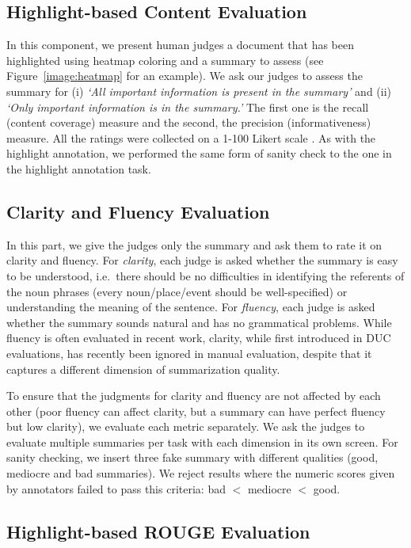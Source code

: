 \documentclass[11pt,a4paper]{article}
\begin{document}
\subsection{Highlight-based Content Evaluation}
In this component, we present human judges a document that has been highlighted using heatmap coloring and a summary to assess (see Figure~\ref{image:heatmap} for an example). We ask our judges to assess the summary for (i) \textit{`All important information is present in the summary'} and (ii) \textit{`Only important information is in the summary.'} The first one is the recall (content coverage) measure and the second, the precision (informativeness) measure. All the ratings were collected on a 1-100 Likert scale \citep{Likert1932}.
As with the highlight annotation, %
we performed the same form of sanity check to the one in the highlight annotation task.


\subsection{Clarity and Fluency Evaluation}
In this part, we give the judges only the summary and ask them to rate it on clarity and fluency. For {\em clarity}, each judge is asked whether the summary is easy to be understood, i.e.\ 
there should be no difficulties in identifying the referents of the noun phrases (every noun/place/event should be well-specified) or understanding the meaning of the sentence. For {\em fluency}, each judge is asked whether the summary sounds natural and has no grammatical problems. %
While fluency is often evaluated in recent work, clarity, while first introduced in DUC evaluations, has recently been ignored in manual evaluation, despite that it captures a different dimension of summarization quality.

To ensure that the judgments for clarity and fluency are not affected by each other (poor fluency can affect clarity, but a summary can have perfect fluency but low clarity), %
we evaluate each metric separately. We ask the judges to evaluate multiple summaries per task with each dimension in its own screen. For sanity checking, we insert three fake summary with different qualities (good, mediocre and bad summaries). We reject results where the numeric scores given by annotators failed to pass this criteria: bad $<$ mediocre $<$ good.

\subsection{Highlight-based ROUGE Evaluation} 
\label{subsec:hrouge}
\end{document}
